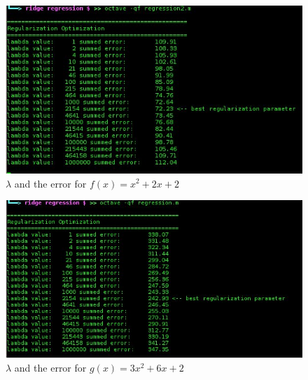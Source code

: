 \documentclass[12pt]{article}
\begin{document}
	\begin{figure}
		\centering
		\includegraphics[scale=0.7]{console_output_small_f}
		\caption{ $\lambda$ and the error for $f(x) = x^2 + 2x + 2$}
		\label{clog_1}
	\end{figure}

	\begin{figure}
		\centering
		\includegraphics[scale=0.7]{console_output_big_f}
		\caption{ $\lambda$ and the error for $g(x) = 3x^2 + 6x + 2$}
		\label{clog_2}
	\end{figure}
\end{document}
